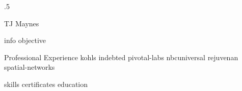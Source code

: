 \documentclass[10pt]{article}
\begin{document}
\moveleft.5\hoffset\centerline{\huge TJ Maynes}
{info}
{objective}
\begin{section}{Professional Experience}
  {kohls}
  {indebted}
  {pivotal-labs}
  {nbcuniversal}
  {rejuvenan}
  {spatial-networks}
\end{section}
{skills}
{certificates}
{education}
\end{document}
